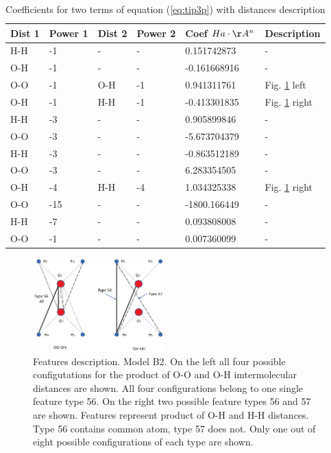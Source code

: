 \documentclass[aps,prl,reprint,amsmath,amssymb,nature]{revtex4-1}
\begin{document}
\begin{table}[h]
\caption{Coefficients for two terms of equation (\ref{eq:tip3p}) with distances description}
\label{Tab:B2 coefficients}
\begin{tabular}{|l|l|l|l|l|l|}
\hline
\textbf{Dist 1} & \textbf{Power 1} & \textbf{Dist 2} & \textbf{
Power 2} & \textbf{Coef $Ha\cdot\AA^n$} & \textbf{Description} \\
\hline
H-H & -1 & - & - & 0.151742873 & - \\
\hline
O-H & -1 & - & - & -0.161668916 & - \\
\hline
O-O & -1 & O-H & -1 & 0.941311761 & Fig. \ref{Fig:B2 Dist} left \\
\hline
O-H & -1 & H-H & -1 & -0.413301835 & Fig. \ref{Fig:B2 Dist} right \\
\hline
H-H & -3 & - & - & 0.905899846 & - \\
\hline
O-O & -3 & - & - & -5.673704379 & - \\
\hline
H-H & -3 & - & - & -0.863512189 & - \\
\hline
O-O & -3 & - & - & 6.283354505 & - \\
\hline
O-H & -4 & H-H & -4 & 1.034325338 & Fig. \ref{Fig:B2 Dist} right \\
\hline
O-O & -15 & - & - & -1800.166449 & - \\
\hline
H-H & -7 & - & - & 0.093808008 & - \\
\hline
O-O & -1 & - & - & 0.007360099 & - \\
\hline
\end{tabular}
\end{table}

\begin{figure}
\includegraphics[width=0.45\textwidth]{media/water_distances_1.eps}
\caption{Features description. Model B2. On the left all four possible configutations for the product of O-O and O-H imtermolecular distances are shown. All four configurations belong to one single feature type 56. On the right two possible feature types 56 and 57 are shown. Features represent product of O-H and H-H distances. Type 56 contains common atom, type 57 does not. Only one out of eight possible configurations of each type are shown.}\label{Fig:B2 Dist}
\end{figure}
\end{document}
